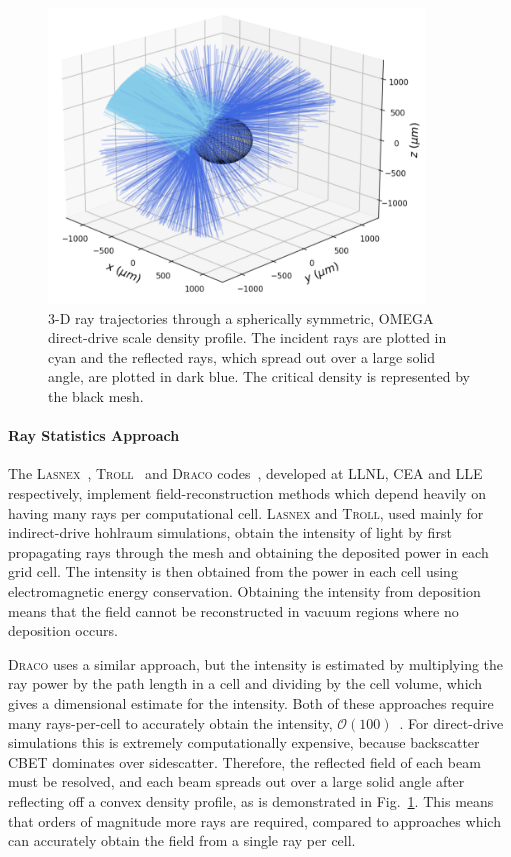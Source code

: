 \begin{figure}[t!]
\includegraphics[width=10cm]{Numerics/Images/Reflected_Rays.png}
\centering
\caption{3-D ray trajectories through a spherically symmetric, OMEGA direct-drive scale density profile.
The incident rays are plotted in cyan and the reflected rays, which spread out over a large solid angle, are plotted in dark blue.
The critical density is represented by the black mesh.}%
\label{fig:reflectedrays}
\end{figure}

\paragraph*{Ray Statistics Approach} The \textsc{Lasnex}~\cite{strozzi_interplay_2017}, \textsc{Troll}~\cite{liberatore_first_2023} and \textsc{Draco} codes~\cite{marozas_wavelength-detuning_2018}, developed at \ac{LLNL}, \ac{CEA} and \ac{LLE} respectively, implement field-reconstruction methods which depend heavily on having many rays per computational cell.
\textsc{Lasnex} and \textsc{Troll}, used mainly for indirect-drive hohlraum simulations, obtain the intensity of light by first propagating rays through the mesh and obtaining the deposited power in each grid cell.
The intensity is then obtained from the power in each cell using electromagnetic energy conservation.
Obtaining the intensity from deposition means that the field cannot be reconstructed in vacuum regions where no deposition occurs.

\textsc{Draco} uses a similar approach, but the intensity is estimated by multiplying the ray power by the path length in a cell and dividing by the cell volume, which gives a dimensional estimate for the intensity.
Both of these approaches require many rays-per-cell to accurately obtain the intensity, $\mathcal{O}(100)$~\cite{debayle_unified_2019}.
For direct-drive simulations this is extremely computationally expensive, because backscatter \ac{CBET} dominates over sidescatter.
Therefore, the reflected field of each beam must be resolved, and each beam spreads out over a large solid angle after reflecting off a convex density profile, as is demonstrated in Fig.~\ref{fig:reflectedrays}.
This means that orders of magnitude more rays are required, compared to approaches which can accurately obtain the field from a single ray per cell.

